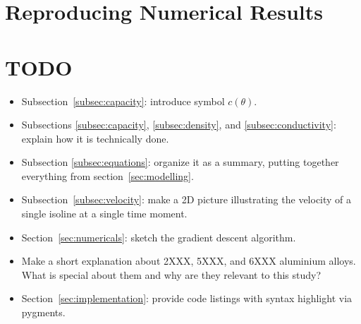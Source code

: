 \section{Reproducing Numerical Results}


\section{TODO}
\begin{itemize}
	\item Subsection~\ref{subsec:capacity}: introduce symbol $c(\theta)$.
	\item Subsections \ref{subsec:capacity}, \ref{subsec:density}, and \ref{subsec:conductivity}: explain how it is technically done.
	\item Subsection \ref{subsec:equations}: organize it as a summary, putting together everything from section~\ref{sec:modelling}.
	\item Subsection~\ref{subsec:velocity}: make a 2D picture illustrating the velocity of a single isoline at a single time moment.
	\item Section~\ref{sec:numericals}: sketch the gradient descent algorithm.
	\item Make a short explanation about 2XXX, 5XXX, and 6XXX aluminium alloys. What is special about them and why are they relevant to this study?
	\item Section~\ref{sec:implementation}: provide code listings with syntax highlight via pygments.
\end{itemize}